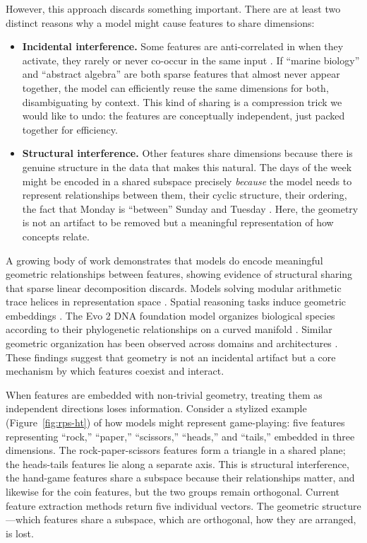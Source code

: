 \documentclass{article}
\theoremstyle{plain}
\numberwithin{equation}{section}
\theoremstyle{definition}
\theoremstyle{remark}
\begin{document}
However, this approach discards something important. There are at least two distinct reasons why a model might cause features to share dimensions:

\begin{itemize}
    \item \textbf{Incidental interference.} Some features are anti-correlated in when they activate, they rarely or never co-occur in the same input \citep{lecomte2023incidental}. If ``marine biology'' and ``abstract algebra'' are both sparse features that almost never appear together, the model can efficiently reuse the same dimensions for both, disambiguating by context. This kind of sharing is a compression trick we would like to undo: the features are conceptually independent, just packed together for efficiency.
    \item \textbf{Structural interference.} Other features share dimensions because there is genuine structure in the data that makes this natural. The days of the week might be encoded in a shared subspace precisely \textit{because} the model needs to represent relationships between them, their cyclic structure, their ordering, the fact that Monday is ``between'' Sunday and Tuesday \citep{engels2024not}. Here, the geometry is not an artifact to be removed but a meaningful representation of how concepts relate.
\end{itemize}

A growing body of work demonstrates that models do encode meaningful geometric relationships between features, showing evidence of structural sharing that sparse linear decomposition discards. Models solving modular arithmetic trace helices in representation space \citep{modularaddition}. Spatial reasoning tasks induce geometric embeddings \citep{spaceandtime}. The Evo 2 DNA foundation model organizes biological species according to their phylogenetic relationships on a curved manifold \citep{treeoflife}. Similar geometric organization has been observed across domains and architectures \citep{ categoricalconcepts, anthropic2025manifolds, projectingassumptions, sequencemodels, flattohierarchical, pan2025hidden, nguyen2025angular}. These findings suggest that geometry is not an incidental artifact but a core mechanism by which features coexist and interact.

When features are embedded with non-trivial geometry, treating them as independent directions loses information. Consider a stylized example (Figure~\ref{fig:rps-ht}) of how models might represent game-playing: five features representing ``rock,'' ``paper,'' ``scissors,'' ``heads,'' and ``tails,'' embedded in three dimensions. The rock-paper-scissors features form a triangle in a shared plane; the heads-tails features lie along a separate axis. This is structural interference, the hand-game features share a subspace because their relationships matter, and likewise for the coin features, but the two groups remain orthogonal. Current feature extraction methods return five individual vectors. The geometric structure—which features share a subspace, which are orthogonal, how they are arranged, is lost.
\end{document}
